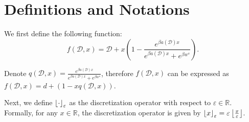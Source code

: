 \section{Definitions and Notations}

We first define the following function:
\[
f(\mathcal{D}, x) = \mathcal{D} + x \left(1- \frac{e^{\beta a(\mathcal{D}) x}}{e^{\beta a(\mathcal{D}) x} + e^{\beta w^s}}\right).
\]

Denote $q(\mathcal{D}, x) = \frac{e^{\beta a(\mathcal{D}) x}}{e^{\beta a(\mathcal{D}) x} + e^{\beta w^s}}$, therefore $f(\mathcal{D},x)$ can be expressed as $f(\mathcal{D},x) = d + (1-x q(\mathcal{D}, x))$.

Next, we define ${\left\lfloor\cdot\right\rfloor_{\varepsilon}}$ as the discretization operator with respect to $\varepsilon \in \mathbb{R}$. Formally, for any $x \in \mathbb{R}$, the discretization operator is given by ${\left\lfloor x\right\rfloor_{\varepsilon}} = \varepsilon \left\lfloor\frac{x}{\varepsilon}\right\rfloor$.

%





% 